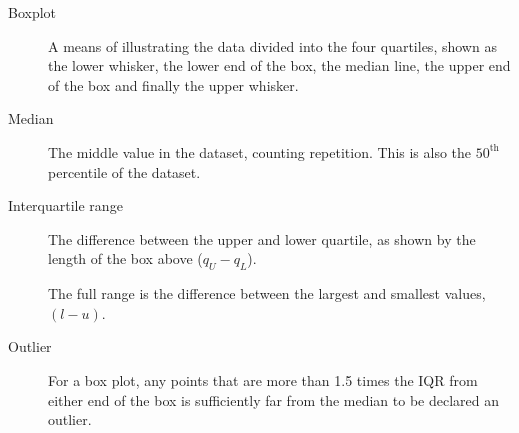 \begin{description}
    \item[Boxplot] A means of illustrating the data divided into the four quartiles,
          shown as the lower whisker, the lower end of the box, the median line,
          the upper end of the box and finally the upper whisker.
          \begin{figure}[H]
              \centering
          \end{figure}

    \item[Median] The middle value in the dataset, counting repetition. This is also the
          $ 50^{\text{th}} $ percentile of the dataset.

    \item[Interquartile range] The difference between the upper and lower quartile, as
          shown by the length of the box above ($ q_U - q_L $). \par
          The full range is the difference between the largest and smallest values,
          $ (l-u) $.

    \item[Outlier] For a box plot, any points that are more than 1.5 times the IQR
          from either end of the box is sufficiently far from the median to be declared
          an outlier.


\end{description}
